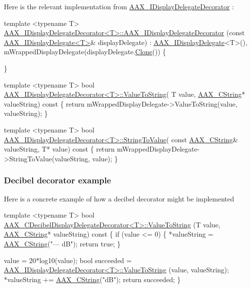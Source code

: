 Here is the relevant implementation from \hyperlink{a00094}{A\+A\+X\+\_\+\+I\+Display\+Delegate\+Decorator} \+:


\begin{DoxyCode}
\textcolor{keyword}{template} <\textcolor{keyword}{typename} T>
\hyperlink{a00094}{AAX\_IDisplayDelegateDecorator<T>::AAX\_IDisplayDelegateDecorator}
      (\textcolor{keyword}{const} \hyperlink{a00092}{AAX\_IDisplayDelegate<T>}& displayDelegate)  :
    \hyperlink{a00092}{AAX\_IDisplayDelegate}<T>(),
    mWrappedDisplayDelegate(displayDelegate.\hyperlink{a00092_a138a82c124ddda8255ce39194dfc1f3f}{Clone}())
\{

\}

\textcolor{keyword}{template} <\textcolor{keyword}{typename} T>
\textcolor{keywordtype}{bool}        \hyperlink{a00094_ada5780cfa332ac7946bf95aa65ae96f5}{AAX\_IDisplayDelegateDecorator<T>::ValueToString}(
      T value, \hyperlink{a00042}{AAX\_CString}* valueString)\textcolor{keyword}{ const }
\textcolor{keyword}{}\{
    \textcolor{keywordflow}{return} mWrappedDisplayDelegate->ValueToString(value, valueString);
\}

\textcolor{keyword}{template} <\textcolor{keyword}{typename} T>
\textcolor{keywordtype}{bool}        \hyperlink{a00094_a18d19293f3eca619cb5bb7f1ffde1a8d}{AAX\_IDisplayDelegateDecorator<T>::StringToValue}(\textcolor{keyword}{
      const} \hyperlink{a00042}{AAX\_CString}& valueString, T* value)\textcolor{keyword}{ const}
\textcolor{keyword}{}\{
    \textcolor{keywordflow}{return} mWrappedDisplayDelegate->StringToValue(valueString, value);
\}
\end{DoxyCode}
\hypertarget{a00346_example}{}\subsubsection{Decibel decorator example}\label{a00346_example}
Here is a concrete example of how a decibel decorator might be implemented


\begin{DoxyCode}
\textcolor{keyword}{template} <\textcolor{keyword}{typename} T>
\textcolor{keywordtype}{bool}    \hyperlink{a00015_a147cb1d0b62b0a62c6e3bb98daf80027}{AAX\_CDecibelDisplayDelegateDecorator<T>::ValueToString}
      (T value, \hyperlink{a00042}{AAX\_CString}* valueString)\textcolor{keyword}{ const }
\textcolor{keyword}{}\{
    \textcolor{keywordflow}{if} (value <= 0)
    \{
         *valueString = \hyperlink{a00042}{AAX\_CString}(\textcolor{stringliteral}{"--- dB"});
        \textcolor{keywordflow}{return} \textcolor{keyword}{true};
    \}
    
    value = 20*log10(value);
    \textcolor{keywordtype}{bool} succeeded = \hyperlink{a00094_ada5780cfa332ac7946bf95aa65ae96f5}{AAX\_IDisplayDelegateDecorator<T>::ValueToString}
      (value, valueString);
     *valueString += \hyperlink{a00042}{AAX\_CString}(\textcolor{stringliteral}{"dB"});
    \textcolor{keywordflow}{return} succeeded;
\}
\end{DoxyCode}


